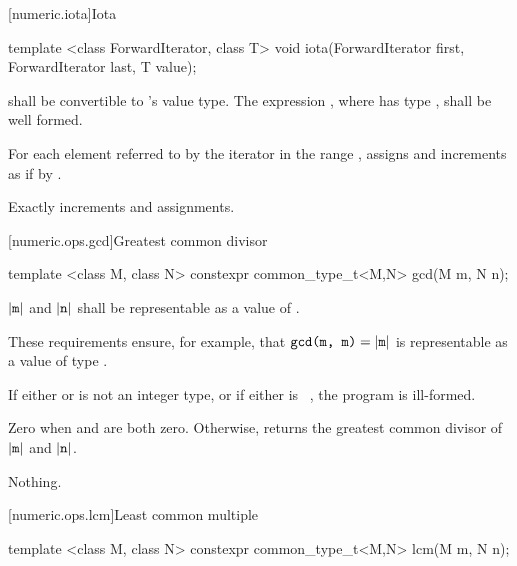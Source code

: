 [numeric.iota]{Iota}

%
\begin{itemdecl}
template <class ForwardIterator, class T>
  void iota(ForwardIterator first, ForwardIterator last, T value);
\end{itemdecl}

\begin{itemdescr}
\pnum
\requires {} shall be convertible to 's value
type. The expression , where  has type , shall
be well formed.

\pnum
\effects For each element referred to by the iterator  in the range
, assigns  and increments  as
if by .

\pnum
\complexity Exactly  increments and assignments.
\end{itemdescr}

[numeric.ops.gcd]{Greatest common divisor}

%
\begin{itemdecl}
template <class M, class N>
  constexpr common_type_t<M,N> gcd(M m, N n);
\end{itemdecl}

\begin{itemdescr}
\pnum
\requires
$|\texttt{m}|$ and $|\texttt{n}|$ shall
be representable as a value of .
\begin{note} These requirements ensure, for example,
that $\texttt{gcd(m, m)} = |\texttt{m}|$ is representable as a value of type . \end{note}

\pnum
\remarks
If either  or  is not an integer type, or
if either is \cv{}~, the program is ill-formed.

\pnum
\returns
Zero when  and  are both zero.
Otherwise, returns the greatest common divisor of $|\texttt{m}|$ and $|\texttt{n}|$.

\pnum
\throws
Nothing.
\end{itemdescr}

[numeric.ops.lcm]{Least common multiple}

%
\begin{itemdecl}
template <class M, class N>
  constexpr common_type_t<M,N> lcm(M m, N n);
\end{itemdecl}

